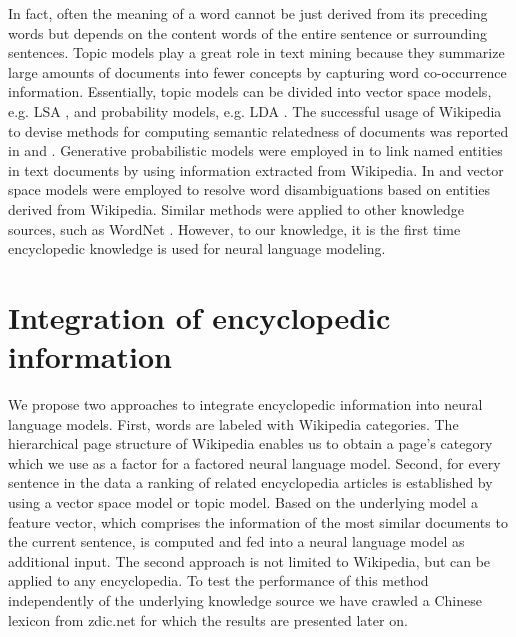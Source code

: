 \documentclass[a4paper]{article}
\begin{document}
In fact, often the meaning of a word cannot be just derived from its preceding words but depends on the content words of the entire sentence or surrounding sentences. 
Topic models play a great role in text mining because they summarize large amounts of documents into fewer concepts by capturing word co-occurrence information. Essentially, topic models can be divided into vector space models, e.g. LSA \cite{deerwester1990indexing}, and probability models, e.g. LDA \cite{blei2003latent}. 
The successful usage of Wikipedia to devise methods for computing semantic relatedness of documents was reported in \cite{gabrilovich2007computing} and \cite{strube2006wikirelate}.
Generative probabilistic models were employed in \cite{han2012entity} to link named entities in text documents by using information extracted from Wikipedia. 
In \cite{cucerzan2007large} and \cite{bunescu2006using} vector space models were employed to resolve word disambiguations based on entities derived from Wikipedia.
Similar methods were applied to other knowledge sources, such as WordNet \cite{hearst1992automatic}.
However, to our knowledge, it is the first time encyclopedic knowledge is used for neural language modeling.

\section{Integration of encyclopedic information}
We propose two approaches to integrate encyclopedic information into neural language models.
First, words are labeled with Wikipedia categories. The hierarchical page structure of Wikipedia enables us to obtain a page's category which we use as a factor for a factored neural language model.
Second, for every sentence in the data a ranking of related encyclopedia articles is established by using a vector space model or topic model. Based on the underlying model a feature vector, which comprises the information of the most similar documents to the current sentence, is computed  and fed into a neural language model as additional input. The second approach is not limited to Wikipedia, but can be applied to any encyclopedia. To test the performance of this method independently of the underlying knowledge source we have crawled a Chinese lexicon from zdic.net \cite{zdic} for which the results are presented later on. 
\end{document}
